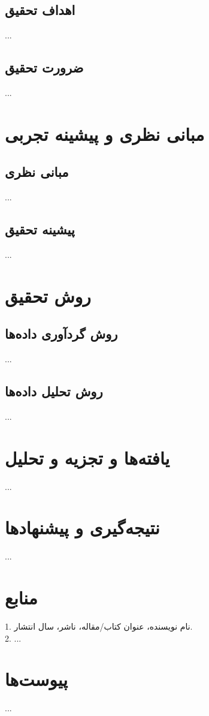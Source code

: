\documentclass[12pt,a4paper]{report}
\begin{document}
\section{اهداف تحقیق}
...

\section{ضرورت تحقیق}
...

\chapter{مبانی نظری و پیشینه تجربی}
\section{مبانی نظری}
...

\section{پیشینه تحقیق}
...

\chapter{روش تحقیق}
\section{روش گردآوری داده‌ها}
...

\section{روش تحلیل داده‌ها}
...

\chapter{یافته‌ها و تجزیه و تحلیل}
...

\chapter{نتیجه‌گیری و پیشنهادها}
...

\chapter*{منابع}
1. نام نویسنده، عنوان کتاب/مقاله، ناشر، سال انتشار. \\
2. ...

\appendix
\chapter{پیوست‌ها}
...
\end{document}
